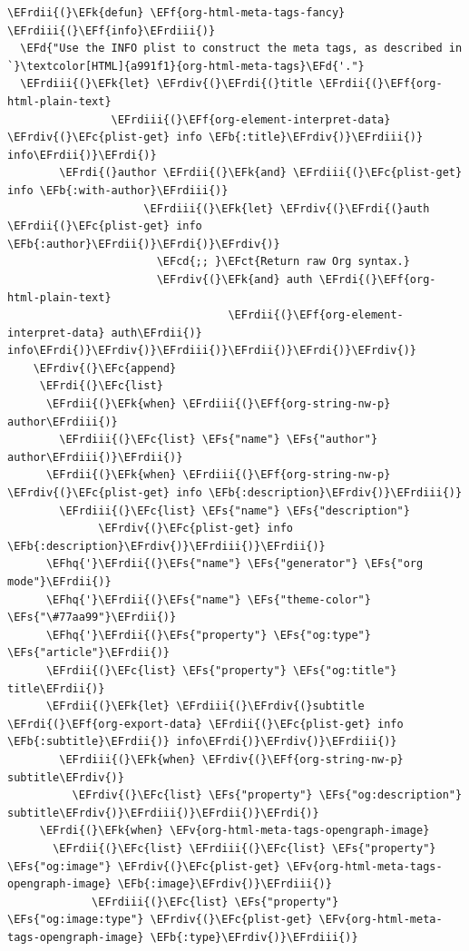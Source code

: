 \documentclass{scrartcl}
\newcommand{\EFk}[1]{\textcolor{EFk}{#1}} %
\newcommand{\EFd}[1]{\textcolor{EFd}{#1}} %
\newcommand{\EFs}[1]{\textcolor{EFs}{#1}} %
\newcommand{\EFb}[1]{\textcolor{EFb}{#1}} %
\newcommand{\EFct}[1]{\textcolor{EFct}{#1}} %
\newcommand{\EFc}[1]{\textcolor{EFc}{#1}} %
\newcommand{\EFv}[1]{\textcolor{EFv}{#1}} %
\newcommand{\EFf}[1]{\textcolor{EFf}{#1}} %
\newcommand{\EFcd}[1]{\textcolor{EFcd}{#1}} %
\newcommand{\EFhq}[1]{#1} %
\newcommand{\EFrdi}[1]{#1} %
\newcommand{\EFrdii}[1]{#1} %
\newcommand{\EFrdiii}[1]{#1} %
\newcommand{\EFrdiv}[1]{#1} %
\begin{document}
\begin{Code}
\begin{Verbatim}[]
\EFrdii{(}\EFk{defun} \EFf{org-html-meta-tags-fancy} \EFrdiii{(}\EFf{info}\EFrdiii{)}
  \EFd{"Use the INFO plist to construct the meta tags, as described in `}\textcolor[HTML]{a991f1}{org-html-meta-tags}\EFd{'."}
  \EFrdiii{(}\EFk{let} \EFrdiv{(}\EFrdi{(}title \EFrdii{(}\EFf{org-html-plain-text}
                \EFrdiii{(}\EFf{org-element-interpret-data} \EFrdiv{(}\EFc{plist-get} info \EFb{:title}\EFrdiv{)}\EFrdiii{)} info\EFrdii{)}\EFrdi{)}
        \EFrdi{(}author \EFrdii{(}\EFk{and} \EFrdiii{(}\EFc{plist-get} info \EFb{:with-author}\EFrdiii{)}
                     \EFrdiii{(}\EFk{let} \EFrdiv{(}\EFrdi{(}auth \EFrdii{(}\EFc{plist-get} info \EFb{:author}\EFrdii{)}\EFrdi{)}\EFrdiv{)}
                       \EFcd{;; }\EFct{Return raw Org syntax.}
                       \EFrdiv{(}\EFk{and} auth \EFrdi{(}\EFf{org-html-plain-text}
                                  \EFrdii{(}\EFf{org-element-interpret-data} auth\EFrdii{)} info\EFrdi{)}\EFrdiv{)}\EFrdiii{)}\EFrdii{)}\EFrdi{)}\EFrdiv{)}
    \EFrdiv{(}\EFc{append}
     \EFrdi{(}\EFc{list}
      \EFrdii{(}\EFk{when} \EFrdiii{(}\EFf{org-string-nw-p} author\EFrdiii{)}
        \EFrdiii{(}\EFc{list} \EFs{"name"} \EFs{"author"} author\EFrdiii{)}\EFrdii{)}
      \EFrdii{(}\EFk{when} \EFrdiii{(}\EFf{org-string-nw-p} \EFrdiv{(}\EFc{plist-get} info \EFb{:description}\EFrdiv{)}\EFrdiii{)}
        \EFrdiii{(}\EFc{list} \EFs{"name"} \EFs{"description"}
              \EFrdiv{(}\EFc{plist-get} info \EFb{:description}\EFrdiv{)}\EFrdiii{)}\EFrdii{)}
      \EFhq{'}\EFrdii{(}\EFs{"name"} \EFs{"generator"} \EFs{"org mode"}\EFrdii{)}
      \EFhq{'}\EFrdii{(}\EFs{"name"} \EFs{"theme-color"} \EFs{"\#77aa99"}\EFrdii{)}
      \EFhq{'}\EFrdii{(}\EFs{"property"} \EFs{"og:type"} \EFs{"article"}\EFrdii{)}
      \EFrdii{(}\EFc{list} \EFs{"property"} \EFs{"og:title"} title\EFrdii{)}
      \EFrdii{(}\EFk{let} \EFrdiii{(}\EFrdiv{(}subtitle \EFrdi{(}\EFf{org-export-data} \EFrdii{(}\EFc{plist-get} info \EFb{:subtitle}\EFrdii{)} info\EFrdi{)}\EFrdiv{)}\EFrdiii{)}
        \EFrdiii{(}\EFk{when} \EFrdiv{(}\EFf{org-string-nw-p} subtitle\EFrdiv{)}
          \EFrdiv{(}\EFc{list} \EFs{"property"} \EFs{"og:description"} subtitle\EFrdiv{)}\EFrdiii{)}\EFrdii{)}\EFrdi{)}
     \EFrdi{(}\EFk{when} \EFv{org-html-meta-tags-opengraph-image}
       \EFrdii{(}\EFc{list} \EFrdiii{(}\EFc{list} \EFs{"property"} \EFs{"og:image"} \EFrdiv{(}\EFc{plist-get} \EFv{org-html-meta-tags-opengraph-image} \EFb{:image}\EFrdiv{)}\EFrdiii{)}
             \EFrdiii{(}\EFc{list} \EFs{"property"} \EFs{"og:image:type"} \EFrdiv{(}\EFc{plist-get} \EFv{org-html-meta-tags-opengraph-image} \EFb{:type}\EFrdiv{)}\EFrdiii{)}

\end{Verbatim}
\end{Code}
\end{document}
